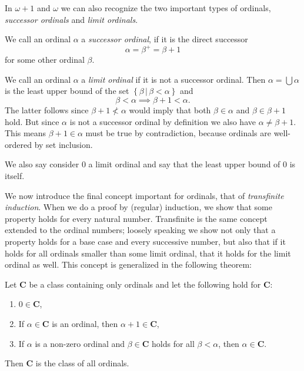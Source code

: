 \documentclass[../../main.tex]{subfiles}
\begin{document}
In $\omega + 1$ and $\omega$ we can also recognize the two important types of ordinals, \textit{successor ordinals} and \textit{limit ordinals}.

\begin{definition}\cite[p.13]{Jec78}
    We call an ordinal $\alpha$ a \textit{successor ordinal}, if it is the direct successor $$\alpha = \beta^+ = \beta + 1$$
    for some other ordinal $\beta$.
\end{definition}

\begin{definition}\cite[Exercise 2.3]{Jec78}
    We call an ordinal $\alpha$ a \textit{limit ordinal} if it is not a successor ordinal.
    Then $\alpha = \bigcup \alpha$ is the least upper bound of the set $\left\{\beta \,\vert\, \beta < \alpha\right\}$ and $$\beta < \alpha \implies \beta + 1 < \alpha.$$
    The latter follows since $\beta + 1 \not< \alpha$ would imply that both $\beta \in \alpha$ and $\beta \in \beta + 1$ hold.
    But since $\alpha$ is not a successor ordinal by definition we also have $\alpha \neq \beta + 1$.
    This means $\beta + 1 \in \alpha$ must be true by contradiction, because ordinals are well-ordered by set inclusion.

    We also say consider $0$ a limit ordinal and say that the least upper bound of $0$ is itself.
\end{definition}

We now introduce the final concept important for ordinals, that of \textit{transfinite induction}.
When we do a proof by (regular) induction, we show that some property holds for every natural number.
Transfinite is the same concept extended to the ordinal numbers; loosely speaking we show not only that a property holds for a base case and every successive number,
but also that if it holds for all ordinals smaller than some limit ordinal, that it holds for the limit ordinal as well.
This concept is generalized in the following theorem:

\begin{theorem}\cite[Theroem 3]{Jec78}
    Let $\mathbf{C}$ be a class containing only ordinals and let the following hold for $\mathbf{C}$:
    \begin{enumerate}[label=(\roman*)]
        \item $0 \in \mathbf{C}$,
        \item If $\alpha \in \mathbf{C}$ is an ordinal, then $\alpha + 1 \in \mathbf{C}$,
        \item If $\alpha$ is a non-zero ordinal and $\beta \in \mathbf{C}$ holds for all $\beta < \alpha$, then $\alpha \in \mathbf{C}$.
    \end{enumerate}
    Then $\mathbf{C}$ is the class of all ordinals.
\end{theorem}
\end{document}
